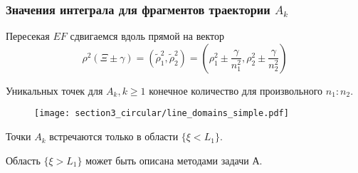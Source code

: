 \begin{frame}\frametitle{Значения интеграла для фрагментов траектории $A_k$}
\qq Пересекая $EF$ сдвигаемся вдоль прямой на вектор
\begin{equation*}
\rho^2(\Xi \pm \gamma) = (\widetilde{\rho}_1^2,\widetilde{\rho}_2^2) = (\rho_1^2 \pm \frac{\gamma}{n_1^2}, \rho_2^2 \pm \frac{\gamma}{n_2^2})
\end{equation*}

\qq Уникальных точек для $A_k, k \geq 1$ конечное количество для произвольного $n_1 : n_2$.


\begin{figure}[!htb]
\centering
\texttt{[image: section3\_circular/line\_domains\_simple.pdf]}
\endminipage\hfill
\end{figure}

\qq Точки $A_k$ встречаются только в области $\{ \xi < L_1 \}$. 

\qq Область  $\{ \xi > L_1 \}$ может быть описана методами задачи А.

\end{frame}

